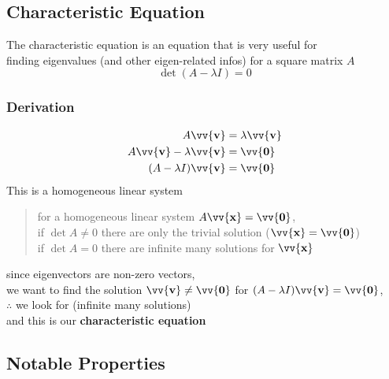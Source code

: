 \documentclass[11pt]{article}
\DeclareRobustCommand{\myvec}[1]{\vv{\mathbf{#1}}}
\newcommand{\mymat}[1]{#1}
\begin{document}
    \newpage
    \subsection{Characteristic Equation}
    The characteristic equation is an equation that is very useful for \\
    finding eigenvalues (and other eigen-related infos) for a square matrix $\mymat{A}$
    \begin{equation}
        \det(\mymat{A}-\lambda \mymat{I}) = 0
    \end{equation}

    \subsubsection{Derivation}
    \begin{align*}
        \mymat{A}\myvec{v} &= \lambda \myvec{v}\\
        \mymat{A}\myvec{v} - \lambda \myvec{v} &= \myvec{0}\\
        (\mymat{A} - \lambda \mymat{I})\myvec{v} &= \myvec{0}
    \end{align*}
    This is a homogeneous linear system\\
    \begin{quote}
        for a homogeneous linear system $\mymat{A}\myvec{x} = \myvec{0}$, \\
        \quad if $\det\mymat{A}\ne0$ \quad there are only the trivial solution ($\myvec{x} = \myvec{0}$) \\
        \quad if $\det\mymat{A}=0$ \quad there are infinite many solutions for $\myvec{x}$
    \end{quote}

    since eigenvectors are non-zero vectors, \\
    we want to find the solution $\myvec{v} \ne \myvec{0}$ for $(\mymat{A} - \lambda \mymat{I})\myvec{v} = \myvec{0}$,\\
    $\therefore$ we look for \fbox{$\det(\mymat{A} - \lambda \mymat{I}) = 0$} \quad (infinite many solutions)\\
    and this is our \textbf{characteristic equation}


    \newpage
    \subsection{Notable Properties}
\end{document}
